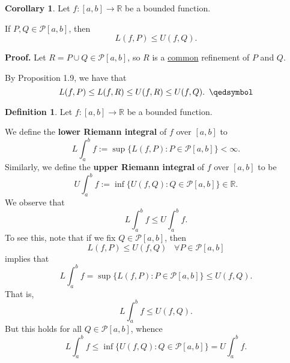 \documentclass[11pt]{article}
\theoremstyle{definition}
\newtheorem{defn}[thm]{Definition}
\newtheorem{cor}[thm]{Corollary}
\newcommand{\mbR}{\ensuremath{\mathbb{R}}}
\begin{document}
\begin{cor}
Let $f : [a, b] \to \mbR$ be a bounded function. 

If $P, Q \in \mathcal{P}[a, b]$, then 
$$L(f, P) \leq U(f, Q) \text{.}$$
\end{cor}
\textbf{Proof.}
Let $R = P \cup Q \in \mathcal{P}[a, b]$, so $R$ is a \underline{common} refinement of $P$ and $Q$. 

By Proposition 1.9, we have that
$$L(f, P) \leq L(f, R) \leq U(f, R) \leq U(f, Q) \text{.} \hspace{5pt} \qedsymbol$$

\begin{defn}
Let $f : [a, b] \to \mbR$ be a bounded function. 

We define the \textbf{lower Riemann integral} of $f$ over $[a, b]$ to
$$L\int_a^b f := \sup\{L(f, P) : P \in \mathcal{P}[a, b]\} < \infty \text{.}$$
Similarly, we define the \textbf{upper Riemann integral} of $f$ over $[a, b]$ to be
$$U\int_a^b f := \inf\{U(f, Q) : Q \in \mathcal{P}[a, b]\} \in \mbR \text{.}$$
We observe that
$$L\int_a^b f \leq U\int_a^b f \text{.}$$
To see this, note that if we fix $Q \in \mathcal{P}[a, b]$, then
$$L(f, P) \leq U(f, Q) \hspace{10pt} \forall P \in \mathcal{P}[a, b]$$
implies that
$$L\int_a^b f = \sup\{L(f, P) : P \in \mathcal{P}[a, b]\} \leq U(f, Q) \text{.}$$
That is,
$$L\int_a^b f \leq U(f, Q) \text{.}$$
But this holds for all $Q \in \mathcal{P}[a, b]$, whence
$$L\int_a^b f \leq \inf\{U(f, Q) : Q \in \mathcal{P}[a, b]\} = U\int_a^b f \text{.}$$
\end{defn}
\end{document}

